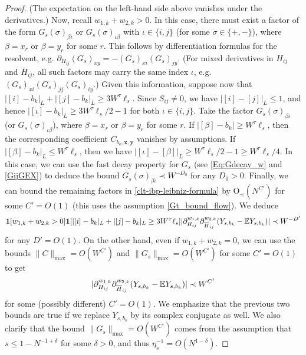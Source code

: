 \begin{proof}
(The expectation on the left-hand side above vanishes under the derivatives.) Now, recall $w_{1,k}+w_{2,k}>0$. In this case, there must exist a factor of the form $G_{s}(\sigma)_{\beta\iota}$ or $G_{s}(\sigma)_{\iota\beta}$ with $\iota\in\{i,j\}$ (for some $\sigma\in\{+,-\}$), where $\beta=x_{r}$ or $\beta=y_{r}$ for some $r$. This follows by differentiation formulas for the resolvent, e.g. $\partial_{H_{ij}}(G_{s})_{xy}=-(G_{s})_{xi}(G_{s})_{jy}$. (For mixed derivatives in $H_{ij}$ and $\overline{H}_{ij}$, all such factors may carry the same index $\iota$, e.g. $(G_{s})_{xi}(G_{s})_{jj}(G_{s})_{iy}$.) Given this information, suppose now that $|[i]-b_{k}|_{L}+|[j]-b_{k}|_{L}\geq 3W^{\tau}\ell_{s}$. Since $S_{ij}\neq0$, we have $|[i]-[j]|_{L}\leq1$, and hence $|[\iota]-b_{k}|_{L}\geq 3W^{\tau}\ell_{s}/2-1$ for both $\iota\in\{i,j\}$. Take the factor $G_{s}(\sigma)_{\beta\iota}$ (or $G_{s}(\sigma)_{\iota\beta}$), where $\beta=x_{r}$ or $\beta=y_{r}$ for some $r$. If $|[\beta]-b_{k}|\geq W^{\tau}\ell_{s}$, then the corresponding coefficient $C_{b_{k},\textbf{x},\textbf{y}}$ vanishes by assumptions. If $|[\beta]-b_{k}|_{L}\leq W^{\tau}\ell_{s}$, then we have $|[\iota]-[\beta]|_{L}\geq W^{\tau}\ell_{s}/2-1\geq W^{\tau}\ell_{s}/4$. In this case, we can use the fast decay property for $G_{s}$ (see \eqref{Eq:Gdecay_w} and \eqref{GijGEX}) to deduce the bound $G_{s}(\sigma)_{\beta\iota}\prec W^{-D_{0}}$ for any $D_{0}>0$. Finally, we can bound the remaining factors in \eqref{clt-ibp-leibniz-formula} by $\mathrm{O}_{\prec}(N^{C'})$ for some $C'=O(1)$ (this uses the assumption \eqref{Gt_bound_flow}). We deduce
%
\begin{align}
\mathbf{1}[w_{1,k}+w_{2,k}>0]\mathbf{1}[|[i]-b_{k}|_{L}+|[j]-b_{k}|_{L}\geq 3W^{\tau}\ell_{s}]|\partial_{H_{ij}}^{w_{1,k}}\partial_{\overline{H}_{ij}}^{w_{2,k}}(Y_{s,b_{k}}-\mathbb{E} Y_{s,b_{k}})|\prec W^{-D'}\label{clt-ibp-decay}
\end{align}
%
for any $D'=O(1)$. On the other hand, even if $w_{1,k}+w_{2,k}=0$, we can use the bounds $\|C\|_{\max}=O(W^{C'})$ and $\|G_{s}\|_{\max}=O(W^{C'})$ for some $C'=O(1)$ to get
%
\begin{align}
|\partial_{H_{ij}}^{w_{1,k}}\partial_{\overline{H}_{ij}}^{w_{2,k}}(Y_{s,b_{k}}-\mathbb{E} Y_{s,b_{k}})|\prec W^{C'}\label{clt-ibp-other-factor-bound}
\end{align}
%
for some (possibly different) $C'=O(1)$. We emphasize that the previous two bounds are true if we replace $Y_{s,b_{k}}$ by its complex conjugate as well. We also clarify that the bound $\|G_{s}\|_{\max}=O(W^{C'})$ comes from the assumption that $s\leq 1-N^{-1+\delta}$ for some $\delta>0$, and thus $\eta_{s}^{-1}=O(N^{1-\delta})$.


\end{proof}
